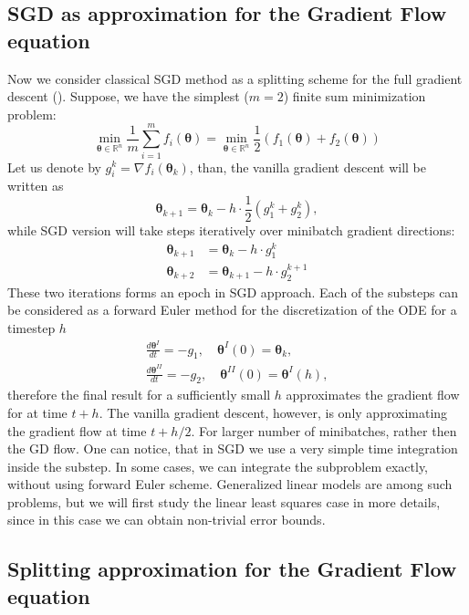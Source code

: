 \documentclass{article}
\newcommand{\vect}[1]{\boldsymbol{\mathbf{#1}}}
\begin{document}
\subsection{SGD as approximation for the Gradient Flow equation}
Now we consider classical SGD method as a splitting scheme for the full gradient descent (\cite{cauchy1847methode}). Suppose, we have the simplest ($m=2$) finite sum minimization problem:
$$
\min_{\vect{\theta} \in \mathbb{R}^n} \frac{1}{m}\sum\limits_{i=1}^m f_i(\vect{\theta}) = \min_{\vect{\theta} \in \mathbb{R}^n} \frac{1}{2} \left( f_1(\vect{\theta}) + f_2(\vect{\theta})\right)
$$
Let us denote by $g_i^k = \nabla f_i(\vect{\theta}_k)$, than, the vanilla gradient descent will be written as
$$
\vect{\theta}_{k+1} = \vect{\theta}_k - h\cdot\frac{1}{2} \left( g^k_1 + g^k_2\right),
$$
while SGD version will take steps iteratively over minibatch gradient directions:
\begin{align*}\label{strang:sgd2}
\vect{\theta}_{k+1} &= \vect{\theta}_k - h\cdot g^k_1 \\
\vect{\theta}_{k+2} &= \vect{\theta}_{k+1} - h\cdot  g^{k+1}_2
\end{align*}
These two iterations forms an epoch in SGD approach. Each of the substeps can be considered as a forward Euler method for the discretization of the ODE for a timestep $h$
\begin{align*}
    \frac{d \vect{\theta}^I}{d t} = -g_1, \quad \vect{\theta}^I(0) = \vect{\theta}_{k},\\
    \frac{d \vect{\theta}^{II}}{d t} = -g_2, \quad \vect{\theta}^{II}(0) = \vect{\theta}^{I}(h),
\end{align*}
therefore the final result for a sufficiently small $h$ approximates the gradient flow for at time $t + h$. The vanilla gradient descent, however, is only approximating the gradient flow at time $t + h/2$. For larger number of minibatches, rather then the GD flow. One can notice, that in SGD we use a very simple time integration inside the substep. In some cases, we can integrate the subproblem exactly, without using forward Euler scheme. Generalized linear models are among such problems, but we will first study the linear least squares case in more details, since in this case we can obtain non-trivial error bounds.

\subsection{Splitting approximation for the Gradient Flow equation}
\end{document}
